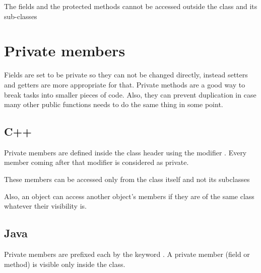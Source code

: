 \documentclass{KodeBook}
\begin{document}


The fields and the protected methods cannot be accessed outside the class and its sub-classes



\section{Private members}

Fields are set to be private so they can not be changed directly, instead setters and getters are more appropriate for that. 
Private methods are a good way to break tasks into smaller pieces of code. 
Also, they can prevent duplication in case many other public functions needs to do the same thing in some point.

\subsection{C++}

Private members are defined inside the class header using the modifier . 
Every member coming after that modifier is considered as private.



These members can be accessed only from the class itself and not its subclasses



Also, an object can access another object's members if they are of the same class whatever their visibility is.



\subsection{Java}

Private members are prefixed each by the keyword . 
A private member (field or method) is visible only inside the class. 


\end{document}
